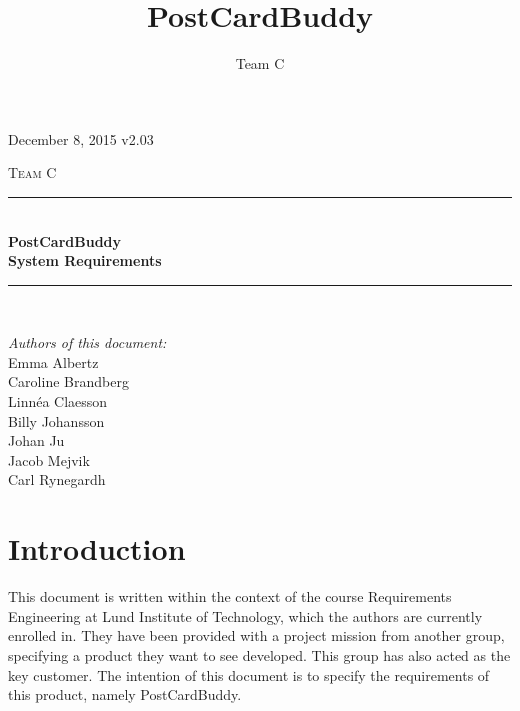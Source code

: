 \documentclass[10pt,a4paper]{article}
\title{PostCardBuddy}
\author{Team C}
\begin{document}
\begin{titlepage}
\newcommand{\HRule}{\rule{\linewidth}{0.5mm}}


\begin{flushright}
December 8, 2015 v2.03\\[3cm]
\end{flushright}


\centering
\textsc{\LARGE Team C}\\[0.5cm]

\HRule \\[0.4cm]
{ \huge \bfseries PostCardBuddy}\\[0.3cm]
{\Large \bfseries System Requirements}\\[0.4cm] %
\HRule \\[1.5cm]

\vfill
\begin{flushleft}
\textit{Authors of this document:}\\
Emma Albertz\\
Caroline Brandberg\\
Linnéa Claesson\\
Billy Johansson\\
Johan Ju\\
Jacob Mejvik\\
Carl Rynegardh
\end{flushleft}

\end{titlepage}



%



\setcounter{tocdepth}{2}
\tableofcontents
\newpage
{}

\section{Introduction}
This document is written within the context of the course Requirements Engineering at Lund Institute of Technology, which the authors are currently enrolled in. They have been provided with a project mission from another group, specifying a product they want to see developed. This group has also acted as the key customer. The intention of this document is to specify the requirements of this product, namely PostCardBuddy.
\end{document}
